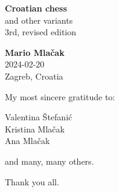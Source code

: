 \documentclass[a5paper,12pt]{book} %
\begin{document}
\thispagestyle{empty}
\vspace*{7.3\baselineskip}
\begin{center}
    \textbf{\Large{Croatian chess}} \\ [1.0em]
    \large{and other variants} \\ [1.0em]
    \small{3rd, revised edition} \\ [2.0cm]
    \vspace*{7.3\baselineskip}

    \textbf{\large{Mario Mlačak}} \\ [1.0em]
    \small{2024-02-20} \\ [0.5em] %
    \small{Zagreb, Croatia}
\end{center}
\clearpage %

\thispagestyle{empty}
\vspace*{0.1\textheight}
\clearpage %

\thispagestyle{empty}
\vspace*{0.2\textheight}
\begin{flushright}
My most sincere gratitude to:

Valentina Štefanić \\
Kristina Mlačak \\
Ana Mlačak

and many, many others.

Thank you all.
\end{flushright}
\clearpage %

\thispagestyle{empty}
\vspace*{0.1\textheight}
\clearpage %


\end{document}
